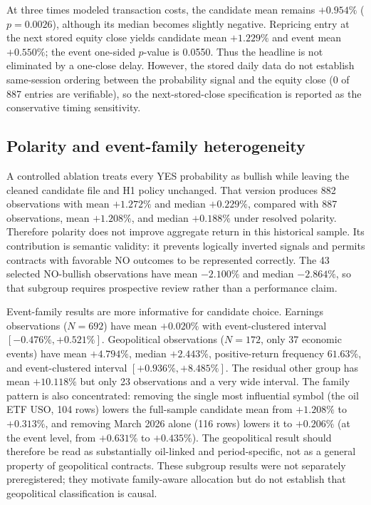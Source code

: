 \documentclass[sigconf,anonymous]{acmart}
\begin{document}
At three times modeled transaction costs, the candidate mean remains $+0.954\%$ ($p=0.0026$), although its median becomes slightly negative. Repricing entry at the next stored equity close yields candidate mean $+1.229\%$ and event mean $+0.550\%$; the event one-sided $p$-value is 0.0550. Thus the headline is not eliminated by a one-close delay. However, the stored daily data do not establish same-session ordering between the probability signal and the equity close (0 of 887 entries are verifiable), so the next-stored-close specification is reported as the conservative timing sensitivity.

\subsection{Polarity and event-family heterogeneity}

A controlled ablation treats every YES probability as bullish while leaving the cleaned candidate file and H1 policy unchanged. That version produces 882 observations with mean $+1.272\%$ and median $+0.229\%$, compared with 887 observations, mean $+1.208\%$, and median $+0.188\%$ under resolved polarity. Therefore polarity does not improve aggregate return in this historical sample. Its contribution is semantic validity: it prevents logically inverted signals and permits contracts with favorable NO outcomes to be represented correctly. The 43 selected NO-bullish observations have mean $-2.100\%$ and median $-2.864\%$, so that subgroup requires prospective review rather than a performance claim.

Event-family results are more informative for candidate choice. Earnings observations ($N=692$) have mean $+0.020\%$ with event-clustered interval $[-0.476\%,+0.521\%]$. Geopolitical observations ($N=172$, only 37 economic events) have mean $+4.794\%$, median $+2.443\%$, positive-return frequency $61.63\%$, and event-clustered interval $[+0.936\%,+8.485\%]$. The residual other group has mean $+10.118\%$ but only 23 observations and a very wide interval. The family pattern is also concentrated: removing the single most influential symbol (the oil ETF USO, 104 rows) lowers the full-sample candidate mean from $+1.208\%$ to $+0.313\%$, and removing March 2026 alone (116 rows) lowers it to $+0.206\%$ (at the event level, from $+0.631\%$ to $+0.435\%$). The geopolitical result should therefore be read as substantially oil-linked and period-specific, not as a general property of geopolitical contracts. These subgroup results were not separately preregistered; they motivate family-aware allocation but do not establish that geopolitical classification is causal.
\end{document}
